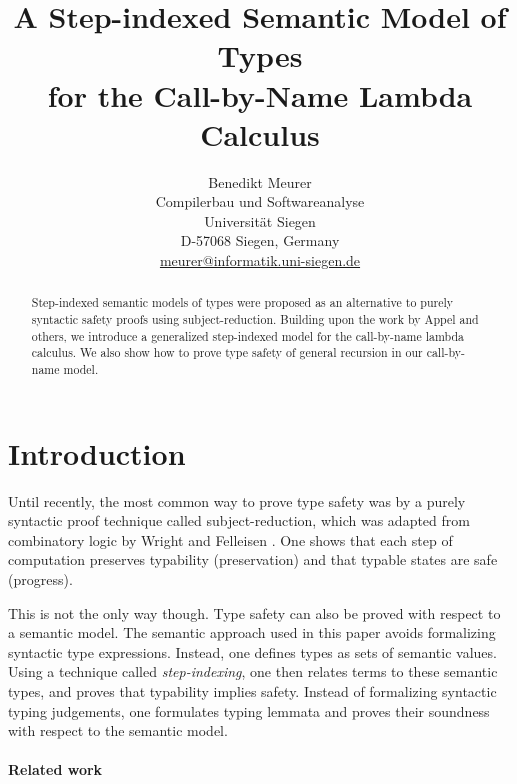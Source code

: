 \documentclass[10pt,a4paper,final,twocolumn]{article}
\theoremstyle{definition}
\theoremstyle{plain}
\begin{document}
\author{%
  Benedikt Meurer\\
  Compilerbau und Softwareanalyse\\
  Universit\"at Siegen\\
  D-57068 Siegen, Germany\\
  \url{meurer@informatik.uni-siegen.de}
}
\date{}
\title{
  A Step-indexed Semantic Model of Types\\
  for the Call-by-Name Lambda Calculus
}
\maketitle

\begin{abstract}
  Step-indexed semantic models of types were proposed as an alternative to purely syntactic
  safety proofs using subject-reduction. Building upon the work by Appel and others, we
  introduce a generalized step-indexed model for the call-by-name lambda calculus. We also
  show how to prove type safety of general recursion in our call-by-name model.
\end{abstract}


\section{Introduction}
\label{sec:Introduction}


Until recently, the most common way to prove type safety was by a purely syntactic proof
technique called subject-reduction, which was adapted from combinatory logic by Wright
and Felleisen \cite{Wright94}. One shows that each step of computation preserves
typability (preservation) and that typable states are safe (progress).

This is not the only way though. Type safety can also be proved with respect to a semantic model. The
semantic approach used in this paper avoids formalizing syntactic type expressions. Instead, one defines 
types as sets of semantic values. Using a technique called \emph{step-indexing}, one then relates terms
to these semantic types, and proves that typability implies safety. Instead of formalizing syntactic
typing judgements, one formulates typing lemmata and proves their soundness with respect to the semantic
model.


\paragraph{Related work}
\label{par:Related_work}
\end{document}
